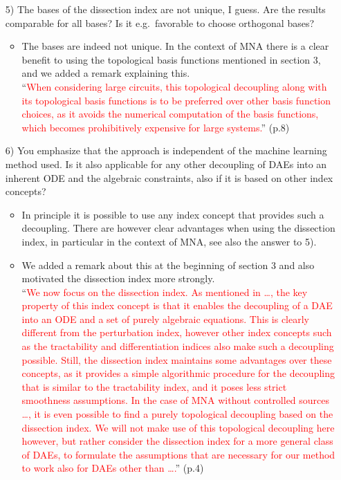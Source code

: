\documentclass[a4paper, 10pt,
    ]{article}
\begin{document}
\begin{itemize}
        \item[5)] \textcolor{TUDa-0c}{The bases of the dissection index are not unique, I guess. Are the results comparable for all bases? Is it e.g.~favorable to choose orthogonal bases?}
        \begin{itemize}
            \item The bases are indeed not unique. In the context of MNA there is a clear benefit to using the topological basis functions mentioned in section 3, and we added a remark explaining this.\\
            ``\textcolor{red}{When considering large circuits, this topological decoupling along with its topological basis functions is to be preferred over other basis function choices, as it avoids the numerical computation of the basis functions, which becomes prohibitively expensive for large systems.}'' (p.8)
        \end{itemize}

        \item[6)] \textcolor{TUDa-0c}{You emphasize that the approach is independent of the machine learning method used. Is it also applicable for any other decoupling of DAEs into an inherent ODE and the algebraic constraints, also if it is based on other index concepts?}
        \begin{itemize}
            \item In principle it is possible to use any index concept that provides such a decoupling. There are however clear advantages when using the dissection index, in particular in the context of MNA, see also the answer to 5).
            \item We added a remark about this at the beginning of section 3 and also motivated the dissection index more strongly.\\
            ``\textcolor{red}{We now focus on the dissection index. As mentioned in \dots, the key property of this index concept is that it enables the decoupling of a DAE into an ODE and a set of purely algebraic equations. This is clearly different from the perturbation index, however other index concepts such as the tractability and differentiation indices also make such a decoupling possible. Still, the dissection index maintains some advantages over these concepts, as it provides a simple algorithmic procedure for the decoupling that is similar to the tractability index, and it poses less strict smoothness assumptions. In the case of MNA without controlled sources \dots, it is even possible to find a purely topological decoupling based on the dissection index. We will not make use of this topological decoupling here however, but rather consider the dissection index for a more general class of DAEs, to formulate the assumptions that are necessary for our method to work also for DAEs other than \dots.}'' (p.4)
        \end{itemize}
    \end{itemize}
\end{document}
